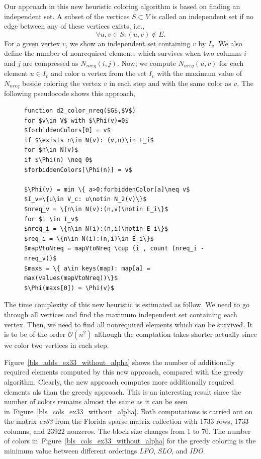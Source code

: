 \documentclass[12pt, twoside]{book}
\newcommand{\figref}[1]{Figure~\protect\ref{#1}}
\begin{document}
Our approach in this new heuristic coloring algorithm is based on finding an independent set. A subset of the vertices $S\subset V$ is
called an independent set if no edge between any of these vertices exists, i.e.,
$$\forall u,v\in S: (u,v)\notin E.$$
For a given vertex $v$, we show an independent set containing $v$ by $I_v$. We also define the number of nonrequired elements which survives when two columns $i$ and $j$ are compressed as $N_{nreq}(i,j)$. Now, we compute $N_{nreq}(u,v)$ for each element $u\in I_v$ and color a vertex from the set $I_v$ with the maximum value of $N_{nreq}$ beside coloring the vertex $v$ in each step and with the same color as $v$. The following pseudocode shows this approach,
\begin{figure}
\begin{lstlisting}[caption=New coloring heuristic for distance-$2$ coloring
considering the nonrequired elements.,label=code.new.d2,mathescape]
function d2_color_nreq($G$,$V$)
for $v\in V$ with $\Phi(v)=0$
$forbiddenColors[0] = v$
if $\exists n\in N(v): (v,n)\in E_i$
for $n\in N(v)$
if $\Phi(n) \neq 0$
$forbiddenColors[\Phi(n)] = v$

$\Phi(v) = min \{ a>0:forbiddenColor[a]\neq v$
$I_v=\{u\in V_c: u\notin N_2(v)\}$
$nreq_v = \{n\in N(v):(n,v)\notin E_i\}$
for $i \in I_v$
$nreq_i = \{n\in N(i):(n,i)\notin E_i\}$
$req_i = \{n\in N(i):(n,i)\in E_i\}$
$mapVtoNreq = mapVtoNreq \cup (i , count (nreq_i - nreq_v))$
$maxs = \{ a\in keys(map): map[a] = max(values(mapVtoNreq))\}$
$\Phi(maxs[0]) = \Phi(v)$
\end{lstlisting}
\end{figure}

The time complexity of this new heuristic is estimated as follow.
We need to go through all vertices
and find the maximum independent set containing each vertex.
Then, we need to find all nonrequired elements which can be survived.
It is to be of the order $\mathcal{O}(n^2)$
although the comptation takes shorter actually
since we color two vertices in each step.

\figref{bls_adds_ex33_without_alpha} shows the number of additionally required elements
computed by this new approach, compared with the greedy algorithm. Clearly,
the new approach computes more additionally required elements als than the greedy approach.
This is an interesting result since the number of colors remains almost the same
as it can be seen in~\figref{bls_cols_ex33_without_alpha}.
Both computations is carried out on the matrix \textit{ex33} from the Florida sparse matrix
collection with 1733 rows, 1733 columns, and 23922 nonzeros. The block size changes
from $1$ to $70$. The number of colors in~\figref{bls_cols_ex33_without_alpha} for the greedy coloring
is the minimum value between different orderings \textit{LFO}, \textit{SLO}, and \textit{IDO}.
\end{document}
